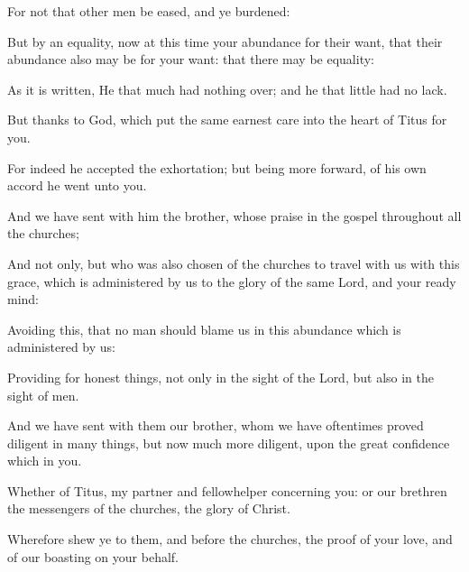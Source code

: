 {For
{}
not
that other
men be
eased,
and
ye
burdened:

But by an equality,
{} now at this time your abundance
{} for their want,
that
their
abundance
also may
be
{}
for
your
want:
that there may
be
equality:

As it is
written, He
that
{}
much
had
nothing
over;
and he
that
{}
little
had
no
lack.

But
thanks
{} to
God,
which
put the
same earnest
care
into the
heart of
Titus
for
you.

For
indeed he
accepted the
exhortation;
but
being more
forward, of his own
accord he
went
unto
you.

And we have
sent
with
him the
brother,
whose
praise
{}
in the
gospel
throughout
all the
churches;

And
not
{}
only,
but who
was
also
chosen
of the
churches to travel
with
us
with
this
grace,
which is
administered
by
us
to the
glory of the
same
Lord,
and
{}
your ready
mind:

Avoiding
this, that
no
man should
blame
us
in
this
abundance which is
administered
by
us:

Providing
for honest
things,
not
only in the sight
of the
Lord,
but
also in the sight
of
men.

And we have sent
with
them
our
brother,
whom we
have
oftentimes
proved
diligent
in many
things,
but
now
much more
diligent, upon the
great
confidence
which
{}
in
you.

Whether
{}
of
Titus,
{}
my
partner
and
fellowhelper
concerning
you:
or
our
brethren
{} the
messengers of the
churches,
{} the
glory of
Christ.

Wherefore shew
ye
to
them,
and
before the
churches, the
proof of
your
love,
and of
our
boasting
on your
behalf.




\par }
